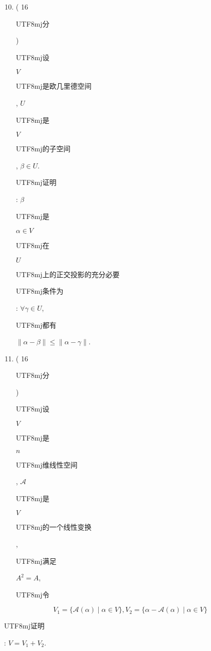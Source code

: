 \documentclass[10pt]{article}
\begin{document}
\begin{enumerate}
  \setcounter{enumi}{9}
  \item ( 16 \begin{CJK}{UTF8}{mj}分\end{CJK}) \begin{CJK}{UTF8}{mj}设\end{CJK} $V$ \begin{CJK}{UTF8}{mj}是欧几里德空间\end{CJK}, $U$ \begin{CJK}{UTF8}{mj}是\end{CJK} $V$ \begin{CJK}{UTF8}{mj}的子空间\end{CJK}, $\beta \in U$. \begin{CJK}{UTF8}{mj}证明\end{CJK}: $\beta$ \begin{CJK}{UTF8}{mj}是\end{CJK} $\alpha \in V$ \begin{CJK}{UTF8}{mj}在\end{CJK} $U$ \begin{CJK}{UTF8}{mj}上的正交投影的充分必要\end{CJK} \begin{CJK}{UTF8}{mj}条件为\end{CJK}: $\forall \gamma \in U$, \begin{CJK}{UTF8}{mj}都有\end{CJK} $\|\alpha-\beta\| \leqslant\|\alpha-\gamma\|$.

  \item ( 16 \begin{CJK}{UTF8}{mj}分\end{CJK}) \begin{CJK}{UTF8}{mj}设\end{CJK} $V$ \begin{CJK}{UTF8}{mj}是\end{CJK} $n$ \begin{CJK}{UTF8}{mj}维线性空间\end{CJK}, $\mathcal{A}$ \begin{CJK}{UTF8}{mj}是\end{CJK} $V$ \begin{CJK}{UTF8}{mj}的一个线性变换\end{CJK}, \begin{CJK}{UTF8}{mj}满足\end{CJK} $A^{2}=A$, \begin{CJK}{UTF8}{mj}令\end{CJK}

\end{enumerate}
$$
V_{1}=\{\mathcal{A}(\alpha) \mid \alpha \in V\}, V_{2}=\{\alpha-\mathcal{A}(\alpha) \mid \alpha \in V\}
$$
\begin{CJK}{UTF8}{mj}证明\end{CJK}: $V=V_{1}+V_{2}$.
\end{document}
